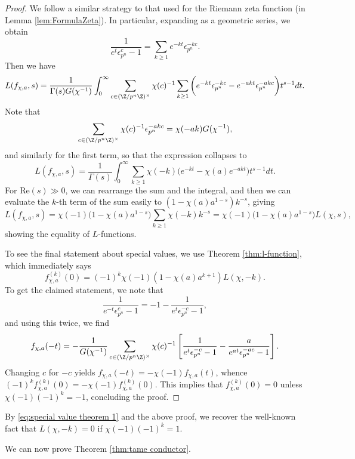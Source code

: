 \documentclass[a4paper,10pt, english, reqno]{smfart}
\numberwithin{equation}{section}
\begin{document}
\begin{proof}
We follow a similar strategy to that used for the Riemann zeta function (in Lemma \ref{lem:FormulaZeta}). In particular, expanding as a geometric series, we obtain
\[ \frac{1}{e^t\epsilon_{p^n}^{c} - 1} = \sum_{k\geq 1} e^{-kt}\epsilon_{p^n}^{-kc}.\]
Then we have
\[L(f_{\chi,a},s) = \frac{1}{\Gamma(s)G(\chi^{-1})}\int_0^\infty \sum_{c \in (\Z/p^n \Z)^\times} \chi(c)^{-1}\sum_{k\geq 1} \bigg(e^{-kt}\epsilon_{p^n}^{-kc} - e^{-akt}\epsilon_{p^n}^{-akc}\bigg) t^{s-1}dt.\]
Note that
\[\sum_{c\in(\Z/p^n \Z)^\times}\chi(c)^{-1}\epsilon_{p^n}^{-akc} = \chi(-ak)G(\chi^{-1}),\]
and similarly for the first term, so that the expression collapses to
\[L(f_{\chi,a},s) = \frac{1}{\Gamma(s)}\int_0^\infty \sum_{k\geq 1} \chi(-k) \big(e^{-kt} - \chi(a)e^{-akt}\big)t^{s-1}dt.\]
For Re$(s) \gg 0$, we can rearrange the sum and the integral, and then we can evaluate the $k$-th term of the sum easily to $(1-\chi(a)a^{1-s})k^{-s}$, giving
\[L(f_{\chi,a},s) = \chi(-1)\big(1-\chi(a)a^{1-s}\big)\sum_{k\geq 1}\chi(-k)k^{-s} = \chi(-1)\big(1-\chi(a)a^{1-s}\big) L(\chi, s),\]
showing the equality of $L$-functions. 

 To see the final statement about special values, we use Theorem \ref{thm:l-function}, which immediately says 
 \begin{equation}\label{eq:special value theorem 1}
    f_{\chi,a}^{(k)}(0) = (-1)^{k}\chi(-1)(1-\chi(a)a^{k+1})L(\chi,-k).
\end{equation}
To get the claimed statement, we note that 
\[
    \frac{1}{e^{-t}\epsilon_{p^n}^c - 1} = -1 -\frac{1}{e^t\epsilon_{p^n}^{-c} - 1}, 
\]
and using this twice, we find
\[
    f_{\chi, a}(-t) = -\frac{1}{G(\chi^{-1})}\sum_{c \in (\Z/p^n \Z)^\times} \chi(c)^{-1}\left[\frac{1}{e^t\epsilon_{p^n}^{-c} - 1} - \frac{a}{e^{at}\epsilon_{p^n}^{-ac} - 1}\right].
\]
Changing $c$ for $-c$ yields $f_{\chi, a}(-t) = - \chi(-1) f_{\chi, a}(t)$, whence $(-1)^kf^{(k)}_{\chi,a}(0) = -\chi(-1)f^{(k)}_{\chi,a}(0)$. This implies that $f_{\chi, a}^{(k)}(0) = 0$ unless $\chi(-1) (-1)^k = -1$, concluding the proof.
\end{proof}



\begin{remark}
By  \eqref{eq:special value theorem 1} and the above proof, we recover the well-known fact that $L(\chi,-k) = 0$ if $\chi(-1)(-1)^k = 1$.
\end{remark}


We can now prove Theorem \ref{thm:tame conductor}.
\end{document}
